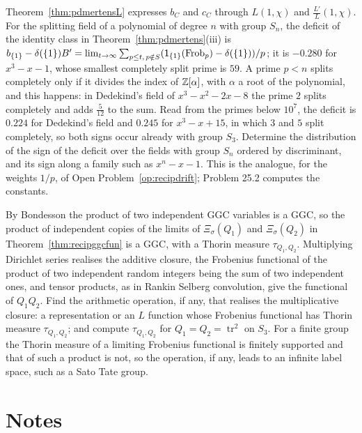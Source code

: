 \begin{problem}\label{op:pdmertens}
Theorem~\ref{thm:pdmertensL} expresses $b_C$ and $c_C$ through $L(1,\chi)$ and $\frac{L'}L(1,\chi)$. For the splitting field of a polynomial of degree $n$ with group $S_n$, the deficit of the identity class in Theorem~\ref{thm:pdmertens}(iii) is $b_{\{1\}}-\delta(\{1\})B'=\lim_{t\to\infty}\sum_{p\le t,\,p\notin S}(\mathsf1_{\{1\}}(\operatorname{Frob}_p)-\delta(\{1\}))/p$; it is $-0.280$ for $x^3-x-1$, whose smallest completely split prime is $59$. A prime $p<n$ splits completely only if it divides the index of $\mathbb{Z}[\alpha]$, with $\alpha$ a root of the polynomial, and this happens: in Dedekind's field of $x^3-x^2-2x-8$ the prime $2$ splits completely and adds $\frac5{12}$ to the sum. Read from the primes below $10^7$, the deficit is $0.224$ for Dedekind's field and $0.245$ for $x^3-x+15$, in which $3$ and $5$ split completely, so both signs occur already with group $S_3$. Determine the distribution of the sign of the deficit over the fields with group $S_n$ ordered by discriminant, and its sign along a family such as $x^n-x-1$. This is the analogue, for the weights $1/p$, of Open Problem~\ref{op:recipdrift}; Problem 25.2 computes the constants.
\end{problem}

\begin{problem}\label{op:pdproduct}
By Bondesson \cite{bondesson2015} the product of two independent GGC variables is a GGC, so the product of independent copies of the limits of $\Xi_\sigma(Q_1)$ and $\Xi_\sigma(Q_2)$ in Theorem~\ref{thm:recipggcfun} is a GGC, with a Thorin measure $\tau_{Q_1,Q_2}$. Multiplying Dirichlet series realises the additive closure, the Frobenius functional of the product of two independent random integers being the sum of two independent ones, and tensor products, as in Rankin Selberg convolution, give the functional of $Q_1Q_2$. Find the arithmetic operation, if any, that realises the multiplicative closure: a representation or an $L$ function whose Frobenius functional has Thorin measure $\tau_{Q_1,Q_2}$; and compute $\tau_{Q_1,Q_2}$ for $Q_1=Q_2=\operatorname{tr}^2$ on $S_3$. For a finite group the Thorin measure of a limiting Frobenius functional is finitely supported and that of such a product is not, so the operation, if any, leads to an infinite label space, such as a Sato Tate group.
\end{problem}

\section{Notes}

